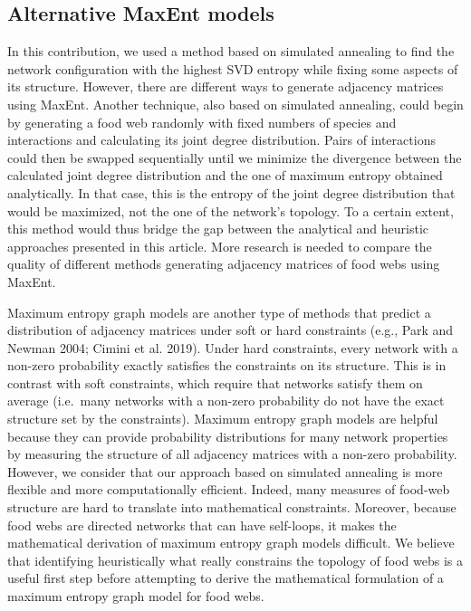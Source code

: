 \documentclass[10pt,oneside]{article}
\begin{document}
\hypertarget{alternative-maxent-models}{%
\subsection{Alternative MaxEnt models}\label{alternative-maxent-models}}

In this contribution, we used a method based on simulated annealing to
find the network configuration with the highest SVD entropy while fixing
some aspects of its structure. However, there are different ways to
generate adjacency matrices using MaxEnt. Another technique, also based
on simulated annealing, could begin by generating a food web randomly
with fixed numbers of species and interactions and calculating its joint
degree distribution. Pairs of interactions could then be swapped
sequentially until we minimize the divergence between the calculated
joint degree distribution and the one of maximum entropy obtained
analytically. In that case, this is the entropy of the joint degree
distribution that would be maximized, not the one of the network's
topology. To a certain extent, this method would thus bridge the gap
between the analytical and heuristic approaches presented in this
article. More research is needed to compare the quality of different
methods generating adjacency matrices of food webs using MaxEnt.

Maximum entropy graph models are another type of methods that predict a
distribution of adjacency matrices under soft or hard constraints (e.g.,
Park and Newman 2004; Cimini et al. 2019). Under hard constraints, every
network with a non-zero probability exactly satisfies the constraints on
its structure. This is in contrast with soft constraints, which require
that networks satisfy them on average (i.e.~many networks with a
non-zero probability do not have the exact structure set by the
constraints). Maximum entropy graph models are helpful because they can
provide probability distributions for many network properties by
measuring the structure of all adjacency matrices with a non-zero
probability. However, we consider that our approach based on simulated
annealing is more flexible and more computationally efficient. Indeed,
many measures of food-web structure are hard to translate into
mathematical constraints. Moreover, because food webs are directed
networks that can have self-loops, it makes the mathematical derivation
of maximum entropy graph models difficult. We believe that identifying
heuristically what really constrains the topology of food webs is a
useful first step before attempting to derive the mathematical
formulation of a maximum entropy graph model for food webs.
\end{document}
